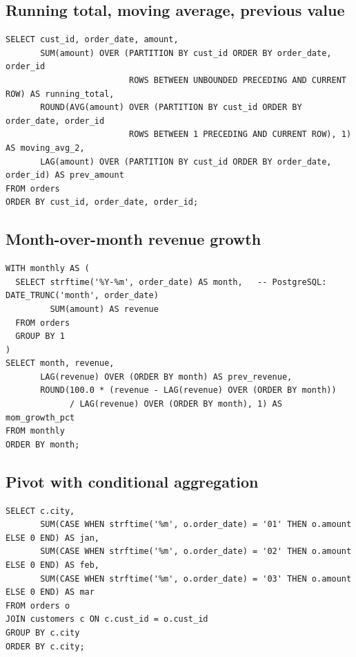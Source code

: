 \subsection{Running total, moving average, previous value}
\begin{lstlisting}[style=sql]
SELECT cust_id, order_date, amount,
       SUM(amount) OVER (PARTITION BY cust_id ORDER BY order_date, order_id
                         ROWS BETWEEN UNBOUNDED PRECEDING AND CURRENT ROW) AS running_total,
       ROUND(AVG(amount) OVER (PARTITION BY cust_id ORDER BY order_date, order_id
                         ROWS BETWEEN 1 PRECEDING AND CURRENT ROW), 1) AS moving_avg_2,
       LAG(amount) OVER (PARTITION BY cust_id ORDER BY order_date, order_id) AS prev_amount
FROM orders
ORDER BY cust_id, order_date, order_id;
\end{lstlisting}

\subsection{Month-over-month revenue growth}
\begin{lstlisting}[style=sql]
WITH monthly AS (
  SELECT strftime('%Y-%m', order_date) AS month,   -- PostgreSQL: DATE_TRUNC('month', order_date)
         SUM(amount) AS revenue
  FROM orders
  GROUP BY 1
)
SELECT month, revenue,
       LAG(revenue) OVER (ORDER BY month) AS prev_revenue,
       ROUND(100.0 * (revenue - LAG(revenue) OVER (ORDER BY month))
             / LAG(revenue) OVER (ORDER BY month), 1) AS mom_growth_pct
FROM monthly
ORDER BY month;
\end{lstlisting}

\subsection{Pivot with conditional aggregation}
\begin{lstlisting}[style=sql]
SELECT c.city,
       SUM(CASE WHEN strftime('%m', o.order_date) = '01' THEN o.amount ELSE 0 END) AS jan,
       SUM(CASE WHEN strftime('%m', o.order_date) = '02' THEN o.amount ELSE 0 END) AS feb,
       SUM(CASE WHEN strftime('%m', o.order_date) = '03' THEN o.amount ELSE 0 END) AS mar
FROM orders o
JOIN customers c ON c.cust_id = o.cust_id
GROUP BY c.city
ORDER BY c.city;
\end{lstlisting}

